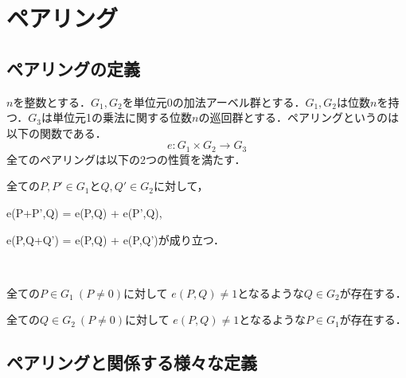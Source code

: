 \chapter{ペアリング}
\par
\section{ペアリングの定義}
\par
$n$を整数とする．$G_1,G_2$を単位元0の加法アーベル群とする．$G_1,G_2$は位数$n$を持つ．$G_3$は単位元1の乗法に関する位数$n$の巡回群とする．ペアリングというのは以下の関数である．
\[
e:G_1\times G_2\longrightarrow G_3
\]
全てのペアリングは以下の2つの性質を満たす．\\
\begin{description}
\item[\textbf{・双線形性}]
全ての$P,P' \in G_{1}$と$Q,Q' \in G_{2}$に対して，

e(P+P',Q) = e(P,Q) + e(P',Q),

e(P,Q+Q') = e(P,Q) + e(P,Q')が成り立つ．\\

\item[\textbf{・非退縮性}] \hspace{0em}\\\vspace{-2em}

\item 全ての$P \in G_{1} \ (P \not= 0)$に対して $e(P,Q) \not= 1$となるような$Q \in G_{2}$が存在する．
\item 全ての$Q \in G_{2} \ (P \not= 0)$に対して $e(P,Q) \not= 1$となるような$P \in G_{1}$が存在する．

\end{description}

\par
\section{ペアリングと関係する様々な定義}
\par

